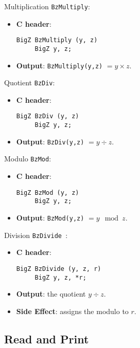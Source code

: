  
\begin{func} Multiplication  \verb+BzMultiply+:
\begin{itemize}
  \item{\bf C header}:
\begin{verbatim}
BigZ BzMultiply (y, z)
     BigZ y, z;
\end{verbatim}
  \item{\bf Output}: \verb+BzMultiply(y,z)+ $= y \times z  $.
\end{itemize}
\end{func}
 
 
\begin{func}  Quotient  \verb+BzDiv+:
\begin{itemize}
  \item{\bf C header}:
\begin{verbatim}
BigZ BzDiv (y, z)
     BigZ y, z;
\end{verbatim}
  \item{\bf Output}: \verb+BzDiv(y,z)+ $= y \div z  $.
\end{itemize}
\end{func}
 
 
\begin{func} Modulo  \verb+BzMod+:
\begin{itemize}
  \item{\bf C header}:
\begin{verbatim}
BigZ BzMod (y, z)
     BigZ y, z;
\end{verbatim}
  \item{\bf Output}: \verb+BzMod(y,z)+ $= y \mod z  $.
\end{itemize}
\end{func}
 
\begin{func} Division  \verb+BzDivide +:
\begin{itemize}
  \item{\bf C header}:
\begin{verbatim}
BigZ BzDivide (y, z, r)
     BigZ y, z, *r;
\end{verbatim}
  \item{\bf Output}: the quotient $y \div z$.
  \item{\bf Side Effect}: assigns the modulo to  $r$.
\end{itemize}
\end{func}
 
\subsection{Read and Print}
 
